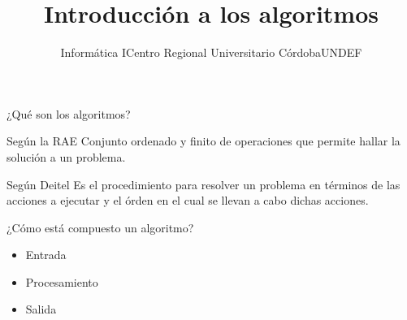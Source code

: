 \documentclass[xcolor=pdftex,table,11pt]{beamer}
\author{Informática I\newline Centro Regional Universitario Córdoba\newline UNDEF }
\title{Introducción a los algoritmos}
\begin{document}
\begin{frame}
\titlepage
\end{frame}

\begin{frame}{¿Qué son los algoritmos?}
\begin{block}{Según la RAE}
         Conjunto ordenado y finito de operaciones que permite hallar la solución a un problema.
    \end{block}
 
 \begin{block}{Según Deitel}
         Es el procedimiento para resolver un problema en términos de las acciones a ejecutar y el órden en el cual se llevan a cabo dichas acciones.
    \end{block}
    
\begin{block}{¿Cómo está compuesto un algoritmo?}
   \begin{itemize}
   \item Entrada
   \item Procesamiento
   \item Salida
   \end{itemize}
\end{block}


\end{frame}
\end{document}
